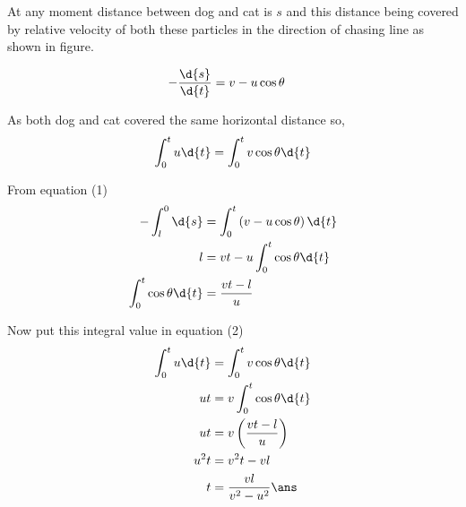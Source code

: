 \documentclass{article}
\begin{document}
At any moment distance between dog and cat is $s$ and this distance being covered by relative velocity of both these particles in the direction of chasing line as shown in figure. 

\begin{align}
-\dfrac{\d{s}}{\d{t}} &= v - u\cos\theta 
\end{align}

\pagebreak

\addtolength{\jot}{4ex}

As both dog and cat covered the same horizontal distance so,
\begin{align}
\int_0^t u\d{t} = \int_0^t v\cos\theta\d{t}
\end{align}

From equation (1)
\begin{align*}
-\int_l^0 \d{s} &= \int_0^t \left( v -u\cos\theta \right) \d{t}\\
l &= vt - u\int_0^t \cos\theta \d{t}\\ 
\int_0^t \cos\theta \d{t} &= \dfrac{vt-l}{u}
\end{align*}

Now put this integral value in equation (2)
\begin{align*}
\int_0^t u\d{t} &= \int_0^t v\cos\theta\d{t}\\
ut &= v\int_0^t \cos\theta \d{t}\\
ut &= v \left(\dfrac{vt-l}{u}\right)\\
u^2t &= v^2t -vl \\
t &= \dfrac{vl}{v^2-u^2}\ans
\end{align*}

\pagebreak
\vspace*{\fill}
\begin{center}
	\fbox{\qrcode[height=2cm]{\gdrive}}
\end{center}
\vspace*{\fill}
\end{document}
